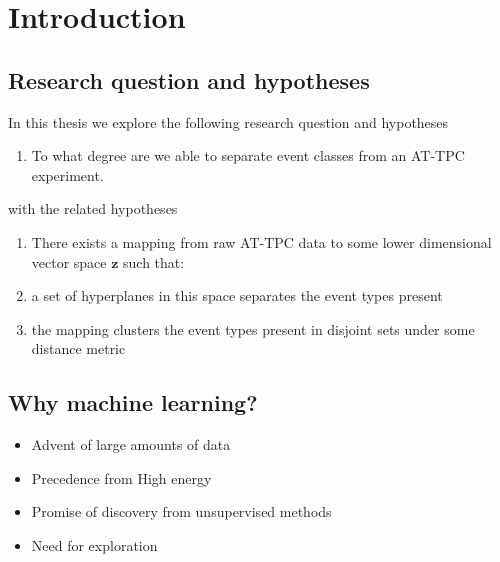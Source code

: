 \chapter{Introduction}\label{ch:introduction}

\section{Research question and hypotheses}
In this thesis we explore the following research question and hypotheses 

\begin{enumerate}[start=0, label={(\bfseries R\arabic*):}]
\item To what degree are we able to separate event classes from an AT-TPC experiment. 
\end{enumerate}

\noindent with the related hypotheses 

\begin{enumerate}[start=0, label={(\bfseries H\arabic*):}]
\item[] There exists a mapping from raw AT-TPC data to some lower dimensional vector space $\mathbf{z}$ such that: 
\item a set of hyperplanes in this space separates the event types present
\item the mapping clusters the event types present in disjoint sets under some distance metric
\end{enumerate}

\section{Why machine learning?}

\begin{itemize}
\item Advent of large amounts of data \\
\item Precedence from High energy \\
\item Promise of discovery from unsupervised methods \\
\item Need for exploration 
\end{itemize}